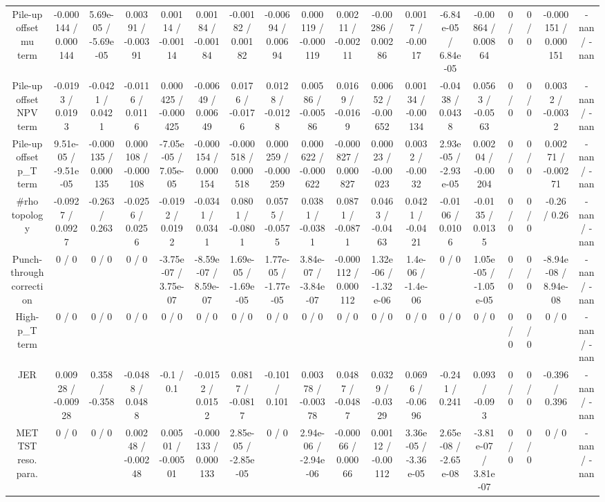 \documentclass[10pt]{article}
\begin{document}
\begin{table}[htbp]
\begin{center}
\begin{tabular}{|c|c|c|c|c|c|c|c|c|c|c|c|c|c|c|c|c|c|}
  Pile-up offset mu term & -0.000144 / 0.000144 & 5.69e-05 / -5.69e-05 & 0.00391 / -0.00391 & 0.00114 / -0.00114 & 0.00184 / -0.00184 & -0.00182 / 0.00182 & -0.00694 / 0.00694 & 0.000119 / -0.000119 & 0.00211 / -0.00211 & -0.00286 / 0.00286 & 0.0017 / -0.0017 & -6.84e-05 / 6.84e-05 & -0.00864 / 0.00864 & 0 / 0 & 0 / 0 & -0.000151 / 0.000151 & -nan / -nan \\ 
  Pile-up offset NPV term & -0.0193 / 0.0193 & -0.0421 / 0.0421 & -0.0116 / 0.0116 & 0.000425 / -0.000425 & -0.00649 / 0.00649 & 0.0176 / -0.0176 & 0.0128 / -0.0128 & 0.00586 / -0.00586 & 0.0169 / -0.0169 & 0.00652 / -0.00652 & 0.00134 / -0.00134 & -0.0438 / 0.0438 & 0.0563 / -0.0563 & 0 / 0 & 0 / 0 & 0.0032 / -0.0032 & -nan / -nan \\ 
  Pile-up offset p_{T} term & 9.51e-05 / -9.51e-05 & -0.000135 / 0.000135 & 0.000108 / -0.000108 & -7.05e-05 / 7.05e-05 & -0.000154 / 0.000154 & -0.000518 / 0.000518 & 0.000259 / -0.000259 & 0.000622 / -0.000622 & -0.000827 / 0.000827 & 0.00023 / -0.00023 & 0.0032 / -0.0032 & 2.93e-05 / -2.93e-05 & 0.00204 / -0.00204 & 0 / 0 & 0 / 0 & 0.00271 / -0.00271 & -nan / -nan \\ 
  #rho topology & -0.0927 / 0.0927 & -0.263 / 0.263 & -0.0256 / 0.0256 & -0.0192 / 0.0192 & -0.0341 / 0.0341 & 0.0801 / -0.0801 & 0.0575 / -0.0575 & 0.0381 / -0.0381 & 0.0871 / -0.0871 & 0.0463 / -0.0463 & 0.0421 / -0.0421 & -0.0106 / 0.0106 & -0.0135 / 0.0135 & 0 / 0 & 0 / 0 & -0.26 / 0.26 & -nan / -nan \\ 
  Punch-through correction & 0 / 0 & 0 / 0 & 0 / 0 & -3.75e-07 / 3.75e-07 & -8.59e-07 / 8.59e-07 & 1.69e-05 / -1.69e-05 & 1.77e-05 / -1.77e-05 & 3.84e-07 / -3.84e-07 & -0.000112 / 0.000112 & 1.32e-06 / -1.32e-06 & 1.4e-06 / -1.4e-06 & 0 / 0 & 1.05e-05 / -1.05e-05 & 0 / 0 & 0 / 0 & -8.94e-08 / 8.94e-08 & -nan / -nan \\ 
  High-p_{T} term & 0 / 0 & 0 / 0 & 0 / 0 & 0 / 0 & 0 / 0 & 0 / 0 & 0 / 0 & 0 / 0 & 0 / 0 & 0 / 0 & 0 / 0 & 0 / 0 & 0 / 0 & 0 / 0 & 0 / 0 & 0 / 0 & -nan / -nan \\ 
  JER & 0.00928 / -0.00928 & 0.358 / -0.358 & -0.0488 / 0.0488 & -0.1 / 0.1 & -0.0152 / 0.0152 & 0.0817 / -0.0817 & -0.101 / 0.101 & 0.00378 / -0.00378 & 0.0487 / -0.0487 & 0.0329 / -0.0329 & 0.0696 / -0.0696 & -0.241 / 0.241 & 0.093 / -0.093 & 0 / 0 & 0 / 0 & -0.396 / 0.396 & -nan / -nan \\ 
  MET TST reso. para. & 0 / 0 & 0 / 0 & 0.00248 / -0.00248 & 0.00501 / -0.00501 & -0.000133 / 0.000133 & 2.85e-05 / -2.85e-05 & 0 / 0 & 2.94e-06 / -2.94e-06 & -0.00066 / 0.00066 & 0.00112 / -0.00112 & 3.36e-05 / -3.36e-05 & 2.65e-08 / -2.65e-08 & -3.81e-07 / 3.81e-07 & 0 / 0 & 0 / 0 & 0 / 0 & -nan / -nan \\ 

\end{tabular}
\end{center}
\end{table}
\end{document}
